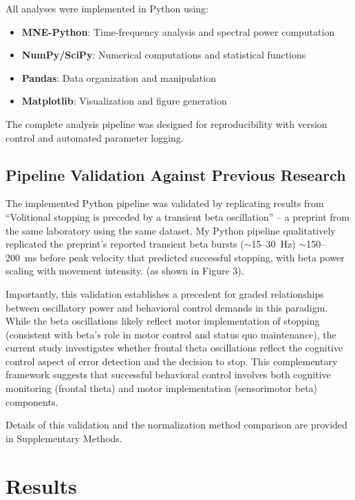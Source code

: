 \documentclass[11pt]{article}
\begin{document}
All analyses were implemented in Python using:
\begin{itemize}
\item \textbf{MNE-Python}: Time-frequency analysis and spectral power computation
\item \textbf{NumPy/SciPy}: Numerical computations and statistical functions
\item \textbf{Pandas}: Data organization and manipulation
\item \textbf{Matplotlib}: Visualization and figure generation
\end{itemize}

The complete analysis pipeline was designed for reproducibility with version control and automated parameter logging.

\subsection{Pipeline Validation Against Previous Research}

The implemented Python pipeline was validated by replicating results from ``Volitional stopping is preceded by a transient beta oscillation'' \citep{doutel2024volitional} -- a preprint from the same laboratory using the same dataset. My Python pipeline qualitatively replicated the preprint's reported transient beta bursts ($\sim$15--30~Hz) $\sim$150--200~ms before peak velocity that predicted successful stopping, with beta power scaling with movement intensity. (as shown in Figure 3).

Importantly, this validation establishes a precedent for graded relationships between oscillatory power and behavioral control demands in this paradigm. While the beta oscillations likely reflect motor implementation of stopping (consistent with beta's role in motor control and status quo maintenance), the current study investigates whether frontal theta oscillations reflect the cognitive control aspect of error detection and the decision to stop. This complementary framework suggests that successful behavioral control involves both cognitive monitoring (frontal theta) and motor implementation (sensorimotor beta) components.

Details of this validation and the normalization method comparison are provided in Supplementary Methods.

\section{Results}
\end{document}
